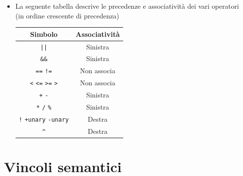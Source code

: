 \documentclass{report}
\newcommand{\term}[1]{\texttt{#1}}
\begin{document}
\begin{itemize}
    \item La seguente tabella descrive le precedenze e associatività dei vari operatori (in ordine crescente di precedenza)
        \begin{center}
        \begin{tabular}{ | c | c | }
            \hline
            \textbf{Simbolo}                        &       \textbf{Associatività}  \\
            \hline
            \term{||}                               &       Sinistra                \\
            \hline
            \term{\&\&}                             &       Sinistra                \\
            \hline
            \term{==} \term{!=}                     &       Non associa             \\
            \hline
            \term{<} \term{<=} \term{>=} \term{>}   &       Non associa             \\
            \hline
            \term{+} \term{-}                       &       Sinistra                \\
            \hline
            \term{*} \term{/} \term{\%}             &       Sinistra                \\
            \hline
            \term{!} \term{+unary} \term{-unary}    &       Destra                  \\
            \hline
            \term{\^{}}                             &       Destra                  \\
            \hline
        \end{tabular}
        \end{center}

\end{itemize}


\section {Vincoli semantici}
\end{document}
